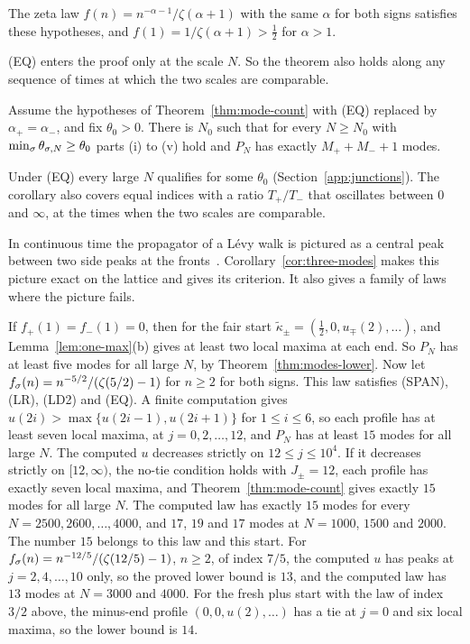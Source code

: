 The zeta law $f(n)=n^{-\alpha-1}/\zeta(\alpha+1)$ with the same $\alpha$ for both signs satisfies
these hypotheses, and $f(1)=1/\zeta(\alpha+1)>\frac12$ for $\alpha>1$.

(EQ) enters the proof only at the scale $N$. So the theorem also holds along any sequence of
times at which the two scales are comparable.

\begin{corollary}\label{cor:sequences}
Assume the hypotheses of Theorem~\ref{thm:mode-count} with (EQ) replaced by
$\alpha_\plus=\alpha_\minus$, and fix $\theta_0>0$. There is $N_0$ such that for every
$N\ge N_0$ with $\min_\sigma\theta_{\sigma,N}\ge\theta_0$ parts (i) to (v) hold and $P_N$ has
exactly $M_\plus+M_\minus+1$ modes.
\end{corollary}

Under (EQ) every large $N$ qualifies for some $\theta_0$ (Section~\ref{app:junctions}). The
corollary also covers equal indices with a ratio $T_\plus/T_\minus$ that oscillates between $0$
and $\infty$, at the times when the two scales are comparable.

In continuous time the propagator of a L\'evy walk is pictured as a central peak between two
side peaks at the fronts~\cite{zdk2015}. Corollary~\ref{cor:three-modes} makes this picture exact
on the lattice and gives its criterion. It also gives a family of laws where the picture fails.

\begin{example}\label{ex:runs2}
If $f_\plus(1)=f_\minus(1)=0$, then for the fair start
$\widetilde\kappa_\pm=(\frac12,0,u_\mp(2),\dots)$, and Lemma~\ref{lem:one-max}(b) gives at least
two local maxima at each end. So $P_N$ has at least five modes for all large $N$, by
Theorem~\ref{thm:modes-lower}. Now let $f_\sigma(n)=n^{-5/2}/(\zeta(5/2)-1)$ for $n\ge2$ for both
signs. This law satisfies (SPAN), (LR), (LD2) and (EQ). A finite computation gives
$u(2i)>\max\{u(2i-1),u(2i+1)\}$ for $1\le i\le6$, so each profile has at least seven local
maxima, at $j=0,2,\dots,12$, and $P_N$ has at least $15$ modes for all large $N$. The computed
$u$ decreases strictly on $12\le j\le10^4$. If it decreases strictly on $[12,\infty)$, the
no-tie condition holds with $J_\pm=12$, each profile has exactly seven local maxima, and
Theorem~\ref{thm:mode-count} gives exactly $15$ modes for all large $N$. The computed law has
exactly $15$ modes for every $N=2500,2600,\dots,4000$, and $17$, $19$ and $17$ modes at
$N=1000$, $1500$ and $2000$. The number $15$ belongs to this law and this start. For
$f_\sigma(n)=n^{-12/5}/(\zeta(12/5)-1)$, $n\ge2$, of index $7/5$, the computed $u$ has peaks at
$j=2,4,\dots,10$ only, so the proved lower bound is $13$, and the computed law has $13$ modes at
$N=3000$ and $4000$. For the fresh plus start with the law of index $3/2$ above, the minus-end
profile $(0,0,u(2),\dots)$ has a tie at $j=0$ and six local maxima, so the lower bound is $14$.
\end{example}

